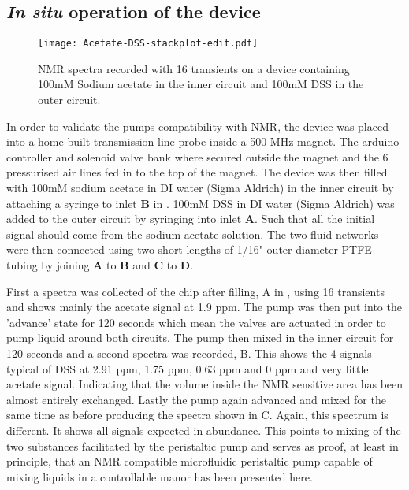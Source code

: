 \subsection{\textit{In situ} operation of the device}

\begin{figure}
  \begin{center}
  \texttt{[image: Acetate-DSS-stackplot-edit.pdf]}
  \caption{NMR spectra recorded with 16 transients on a device containing 100mM Sodium
  acetate in the inner circuit and 100mM DSS in the outer circuit.}
  \label{fig:spectra}
  \end{center}
\end{figure}

In order to validate the pumps compatibility with NMR, the device was placed into a home
built transmission line probe inside a 500 MHz magnet. The arduino controller and solenoid valve
bank where secured outside the magnet and the 6 pressurised air lines fed in to the top of
the magnet. The device was then filled with 100mM sodium acetate in DI water (Sigma Aldrich) in
the inner circuit by attaching a syringe to inlet \textbf{B} in . 100mM DSS in DI
water (Sigma Aldrich) was added to the outer circuit by syringing into inlet \textbf{A}. Such
that all the initial signal should come from the sodium acetate solution. The two fluid networks
were then connected using two short lengths of 1/16" outer diameter PTFE tubing by joining
\textbf{A} to \textbf{B} and \textbf{C} to \textbf{D}.

First a spectra was collected of the chip after filling, A in , using 16
transients and shows mainly the acetate signal at 1.9 ppm. The pump was then put into
the 'advance' state for 120 seconds which mean the valves are actuated in order to pump
liquid around both circuits. The pump then mixed in the inner circuit for 120 seconds
and a second spectra was recorded, B. This shows the 4 signals typical of DSS at 2.91
ppm, 1.75 ppm, 0.63 ppm and 0 ppm and very little acetate signal. Indicating that the
volume inside the NMR sensitive area has been almost entirely exchanged. Lastly the
pump again advanced and mixed for the same time as before producing the spectra shown
in C. Again, this spectrum is different. It shows all signals expected in abundance.
This points to mixing of the two substances facilitated by the peristaltic pump and serves
as proof, at least in principle, that an NMR compatible microfluidic peristaltic pump
capable of mixing liquids in a controllable manor has been presented here.

